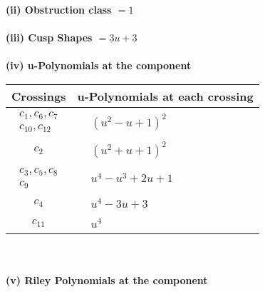\documentclass[1p]{elsarticle_modified}
\theoremstyle{definition}
\begin{document}
\flushleft \textbf{(ii) Obstruction class $= 1$}\\~\\
\flushleft \textbf{(iii) Cusp Shapes $= 3 u+3$}\\~\\
\newpage\renewcommand{\arraystretch}{1}
\flushleft \textbf{(iv) u-Polynomials at the component}\newline \\
\begin{tabular}{m{50pt}|m{274pt}}
Crossings & \hspace{64pt}u-Polynomials at each crossing \\
\hline $$\begin{aligned}c_{1},c_{6},c_{7}\\c_{10},c_{12}\end{aligned}$$&$\begin{aligned}
&(u^2- u+1)^2
\end{aligned}$\\
\hline $$\begin{aligned}c_{2}\end{aligned}$$&$\begin{aligned}
&(u^2+u+1)^2
\end{aligned}$\\
\hline $$\begin{aligned}c_{3},c_{5},c_{8}\\c_{9}\end{aligned}$$&$\begin{aligned}
&u^4- u^3+2 u+1
\end{aligned}$\\
\hline $$\begin{aligned}c_{4}\end{aligned}$$&$\begin{aligned}
&u^4-3 u+3
\end{aligned}$\\
\hline $$\begin{aligned}c_{11}\end{aligned}$$&$\begin{aligned}
&u^4
\end{aligned}$\\
\hline
\end{tabular}\\~\\
\newpage\renewcommand{\arraystretch}{1}
\flushleft \textbf{(v) Riley Polynomials at the component}\newline \\
\end{document}
